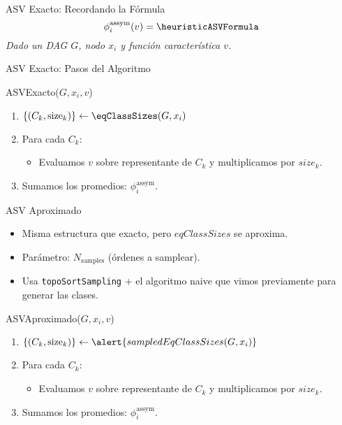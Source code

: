 \begin{frame}{ASV Exacto: Recordando la Fórmula}
	\begin{equation*}
		\phi_i^{\mathrm{assym}}(v)
		= \heuristicASVFormula
	\end{equation*}
	\emph{Dado un DAG $G$, nodo $x_i$ y función característica $v$.}
\end{frame}

\begin{frame}[fragile]{ASV Exacto: Pasos del Algoritmo}
	\begin{algorithm}[H]
		\caption*{ASVExacto($G,x_i,v$)}
		\begin{enumerate}
			\item $\{(C_k,\mathrm{size}_k)\} \leftarrow \eqClassSizes(G,x_i)$
			\item Para cada $C_k$:
			\begin{itemize}
				\item Evaluamos $v$ sobre representante de $C_k$ y multiplicamos por $size_k$.
			\end{itemize}
			\item Sumamos los promedios: $\phi_i^{\mathrm{assym}}$.
		\end{enumerate}
	\end{algorithm}
\end{frame}

\begin{frame}{ASV Aproximado}
	\begin{itemize}[<+- | alert@+>]
		\item Misma estructura que exacto, pero $eqClassSizes$ se aproxima.
		\item Parámetro: $N_{\mathrm{samples}}$ (órdenes a samplear).
		\item Usa \texttt{topoSortSampling} + el algoritmo naive que vimos previamente para generar las clases.
	\end{itemize}
	\pause
	\begin{algorithm}[H]
		\caption*{ASVAproximado($G,x_i,v$)}
		\begin{enumerate}
			\item $\{(C_k,\mathrm{size}_k)\} \leftarrow \alert{sampledEqClassSizes(G,x_i)}$
			\item Para cada $C_k$:
			\begin{itemize}
				\item Evaluamos $v$ sobre representante de $C_k$ y multiplicamos por $size_k$.
			\end{itemize}
			\item Sumamos los promedios: $\phi_i^{\mathrm{assym}}$.
		\end{enumerate}
	\end{algorithm}
\end{frame}

